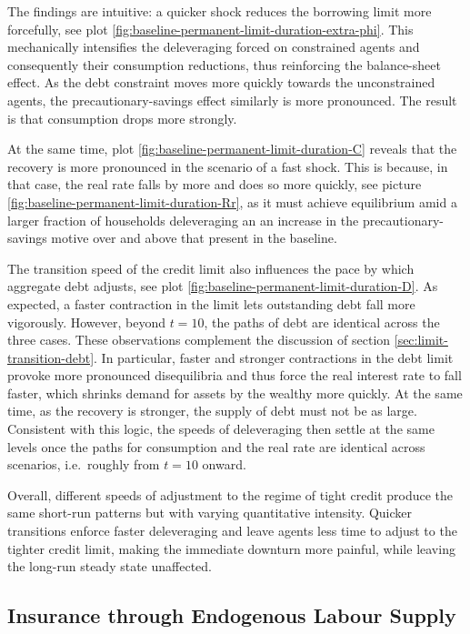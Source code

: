 \documentclass[a4paper,12pt]{article} %
\numberwithin{equation}{section} %
\numberwithin{figure}{section}
\numberwithin{table}{section}
\begin{document}
The findings are intuitive: a quicker shock reduces the borrowing limit more forcefully, see plot \ref{fig:baseline-permanent-limit-duration-extra-phi}. This mechanically intensifies the deleveraging forced on constrained agents and consequently their consumption reductions, thus reinforcing the balance-sheet effect. As the debt constraint moves more quickly towards the unconstrained agents, the precautionary-savings effect similarly is more pronounced. The result is that consumption drops more strongly. 

At the same time, plot \ref{fig:baseline-permanent-limit-duration-C} reveals that the recovery is more pronounced in the scenario of a fast shock. This is because, in that case, the real rate falls by more and does so more quickly, see picture \ref{fig:baseline-permanent-limit-duration-Rr}, as it must achieve equilibrium amid a larger fraction of households deleveraging an an increase in the precautionary-savings motive over and above that present in the baseline.

The transition speed of the credit limit also influences the pace by which aggregate debt adjusts, see plot \ref{fig:baseline-permanent-limit-duration-D}. As expected, a faster contraction in the limit lets outstanding debt fall more vigorously. However, beyond $t=10$, the paths of debt are identical across the three cases. These observations complement the discussion of section \ref{sec:limit-transition-debt}. In particular, faster and stronger contractions in the debt limit provoke more pronounced disequilibria and thus force the real interest rate to fall faster, which shrinks demand for assets by the wealthy more quickly. At the same time, as the recovery is stronger, the supply of debt must not be as large. Consistent with this logic, the speeds of deleveraging then settle at the same levels once the paths for consumption and the real rate are identical across scenarios, i.e.~roughly from $t=10$ onward.

Overall, different speeds of adjustment to the regime of tight credit produce the same short-run patterns but with varying quantitative intensity. Quicker transitions enforce faster deleveraging and leave agents less time to adjust to the tighter credit limit, making the immediate downturn more painful, while leaving the long-run steady state unaffected.

\subsection{Insurance through Endogenous Labour Supply}
\label{sec:sensitivity-end-labour}
\end{document}
